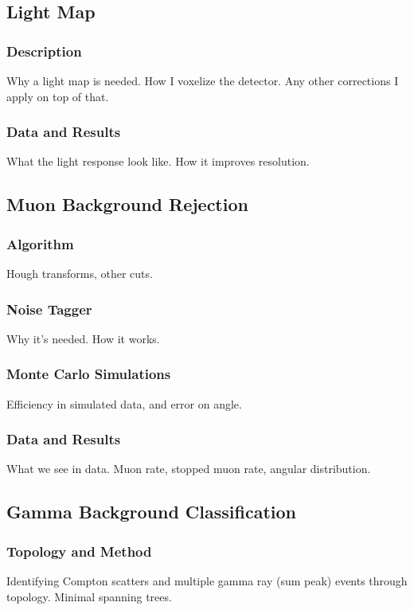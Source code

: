 \documentclass[12pt,letterpaper,onecolumn]{article}
\begin{document}
\subsection{Light Map}

\subsubsection{Description}
Why a light map is needed. How I voxelize the detector. Any other corrections I apply on top of that.

\subsubsection{Data and Results}
What the light response look like. How it improves resolution.

\subsection{Muon Background Rejection}

\subsubsection{Algorithm}
Hough transforms, other cuts.

\subsubsection{Noise Tagger}
Why it's needed. How it works.

\subsubsection{Monte Carlo Simulations}
Efficiency in simulated data, and error on angle.

\subsubsection{Data and Results}
What we see in data. Muon rate, stopped muon rate, angular distribution.

\subsection{Gamma Background Classification}

\subsubsection{Topology and Method}
Identifying Compton scatters and multiple gamma ray (sum peak) events through topology. Minimal spanning trees.
\end{document}
